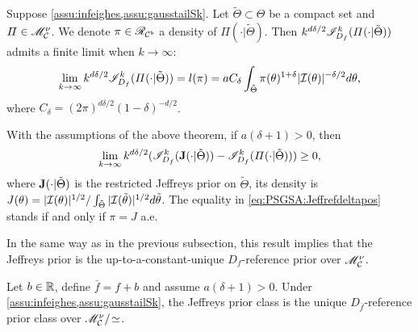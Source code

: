 \begin{thm}\label{thm:refcompactpos}
    Suppose \cref{assu:infeighes,assu:gausstailSk}.  %
    Let $\tilde\Theta\subset\Theta$ be a compact set and  $\varPi\in\mathscr{M}_{\mathcal{C}}^\nu$. We denote $\pi\in\mathscr{R}_{\mathcal{C}^b}$ a density of $\varPi(\cdot|\tilde\Theta)$.
    Then $k^{d\delta/2}\mathscr{I}^k_{D_f}(\varPi(\cdot|\tilde\Theta))$ admits a finite limit when $k\to\infty$:
    \begin{equation}\label{eq:liml}
        \lim_{k\rightarrow\infty} k^{d\delta/2} \mathscr{I}^k_{D_f}(\varPi(\cdot|\tilde\Theta)) = l(\pi) =
a C_\delta \int_{\tilde\Theta}\pi(\theta)^{1+\delta} |\mathcal{I}(\theta)|^{-\delta/2}  d\theta ,
    \end{equation}
where $ C_\delta = (2\pi)^{d\delta/2} (1-\delta)^{-d/2}$.
\end{thm}

\begin{prop}\label{prop:JlimIMdeltapos}
    With the assumptions of the above theorem,  if $a(\delta+1)>0$, then
        \begin{equation}\label{eq:PSGSA:Jeffrefdeltapos}
            \lim_{k\rightarrow\infty}k^{d\delta/2}(\mathscr{I}^k_{D_f}(\mathbf{J}(\cdot|\tilde\Theta))-\mathscr{I}_{D_f}^k(\varPi(\cdot|\tilde\Theta)))\geq 0 ,
        \end{equation}
    where $\mathbf{J}(\cdot|\tilde\Theta)$ is the restricted Jeffreys prior on $\tilde\Theta$, its density is $J(\theta) = |\mathcal{I}(\theta)|^{1/2}/\int_{\tilde\Theta}|\mathcal{I}(\tilde\theta)|^{1/2}d\tilde\theta$.
    The equality in \cref{eq:PSGSA:Jeffrefdeltapos} stands if and only if 
    {$\pi=J$} a.e.
\end{prop}


In the same way as in the previous subsection, this result implies that the Jeffreys prior is the up-to-a-constant-unique $D_f$-reference prior over $\mathscr{M}^\nu_{\mathcal{C}}$.

\begin{thm}\label{thm:PSGSA:Jrefdeltapos}
    Let $b\in\mathbb{R}$, define $\overline{f}=f+b$ and assume $a(\delta+1)>0$.
    Under \cref{assu:infeighes,assu:gausstailSk}, the Jeffreys prior class is the unique $D_{\overline f}$-reference prior class over $\mathscr{M}^\nu_{\mathcal{C}}/\!\simeq$.
\end{thm}


